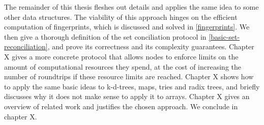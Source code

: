 The remainder of this thesis fleshes out details and applies the same
idea to some other data structures. The viability of this approach
hinges on the efficient computation of fingerprints, which is discussed
and solved in \cref{fingerprints}. We then give a thorough definition of the set
conciliation protocol in \cref{basic-set-reconciliation}, and prove its correctness and its
complexity guarantees. Chapter X gives a more concrete protocol that
allows nodes to enforce limits on the amount of computational resources
they spend, at the cost of increasing the number of roundtrips if these
resource limits are reached. Chapter X shows how to apply the same basic
ideas to k-d-trees, maps, tries and radix trees, and briefly discusses
why it does not make sense to apply it to arrays. Chapter X
gives an overview of related work and justifies the chosen approach. We
conclude in chapter X.